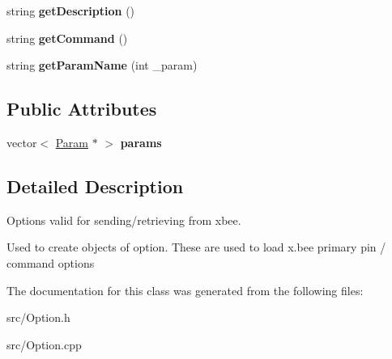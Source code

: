 \begin{DoxyCompactItemize}
\item 
\hypertarget{class_option_a071d327cd2c6e5770d5073bba40aeb27}{
string {\bfseries getDescription} ()}
\label{class_option_a071d327cd2c6e5770d5073bba40aeb27}

\item 
\hypertarget{class_option_a9ecd3443e8ede7ab1e1cc9680a88a58c}{
string {\bfseries getCommand} ()}
\label{class_option_a9ecd3443e8ede7ab1e1cc9680a88a58c}

\item 
\hypertarget{class_option_a4fe3873f9093b1e13d2812f970f56971}{
string {\bfseries getParamName} (int \_\-param)}
\label{class_option_a4fe3873f9093b1e13d2812f970f56971}

\end{DoxyCompactItemize}
\subsection*{Public Attributes}
\begin{DoxyCompactItemize}
\item 
\hypertarget{class_option_aa3cca11fe8471ace6b66e224c88783b4}{
vector$<$ \hyperlink{class_param}{Param} $\ast$ $>$ {\bfseries params}}
\label{class_option_aa3cca11fe8471ace6b66e224c88783b4}

\end{DoxyCompactItemize}


\subsection{Detailed Description}
Options valid for sending/retrieving from xbee. 

Used to create objects of option. These are used to load x.bee primary pin / command options 

The documentation for this class was generated from the following files:\begin{DoxyCompactItemize}
\item 
src/Option.h\item 
src/Option.cpp\end{DoxyCompactItemize}
